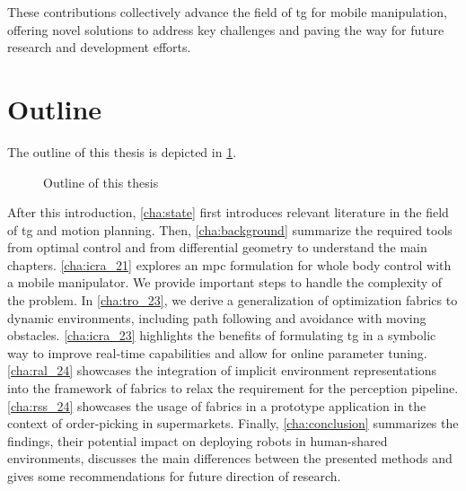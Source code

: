 These contributions collectively advance the field of
\ac{tg} for mobile manipulation, offering novel
solutions to address key challenges and paving the way for
future research and development efforts.

\section{Outline}

The outline of this thesis is depicted in \cref{fig:outline}.
%
\begin{figure}[h]
  \begin{center}
    
  \end{center}
  \caption{Outline of this thesis}
  \label{fig:outline}
\end{figure}
After this introduction, \cref{cha:state} first introduces
relevant literature in the field of \ac{tg}
and motion planning.
Then, \cref{cha:background} summarize the required tools
from optimal control and from differential geometry to
understand the main chapters.
\cref{cha:icra_21} explores an \ac{mpc}
formulation for whole body control
with a mobile manipulator. We provide important steps to
handle the complexity of the problem.
In \cref{cha:tro_23}, we derive a
generalization of optimization fabrics to dynamic
environments, including path following and avoidance with
moving obstacles.
\cref{cha:icra_23} highlights the benefits of
formulating \ac{tg} in a symbolic way to
improve real-time capabilities and allow for online
parameter tuning.
\cref{cha:ral_24} showcases the integration of
implicit environment representations into the framework of
\ac{fabrics} to relax the requirement for the
perception pipeline.
\cref{cha:rss_24} showcases the 
usage of \ac{fabrics} in a prototype application in the
context of order-picking in supermarkets.
Finally,
\cref{cha:conclusion} summarizes the findings, their potential impact
on deploying robots in human-shared environments, discusses
the main differences between the presented methods and gives some
recommendations for future direction of research.


